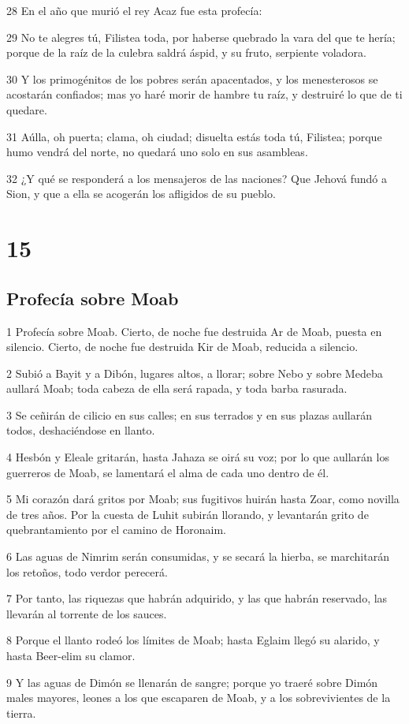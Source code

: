 \par 28 En el año que murió el rey Acaz fue esta profecía:
\par 29 No te alegres tú, Filistea toda, por haberse quebrado la vara del que te hería; porque de la raíz de la culebra saldrá áspid, y su fruto, serpiente voladora.
\par 30 Y los primogénitos de los pobres serán apacentados, y los menesterosos se acostarán confiados; mas yo haré morir de hambre tu raíz, y destruiré lo que de ti quedare.
\par 31 Aúlla, oh puerta; clama, oh ciudad; disuelta estás toda tú, Filistea; porque humo vendrá del norte, no quedará uno solo en sus asambleas.
\par 32 ¿Y qué se responderá a los mensajeros de las naciones? Que Jehová fundó a Sion, y que a ella se acogerán los afligidos de su pueblo.

\chapter{15}

\section*{Profecía sobre Moab}

\par 1 Profecía sobre Moab. Cierto, de noche fue destruida Ar de Moab, puesta en silencio. Cierto, de noche fue destruida Kir de Moab, reducida a silencio.
\par 2 Subió a Bayit y a Dibón, lugares altos, a llorar; sobre Nebo y sobre Medeba aullará Moab; toda cabeza de ella será rapada, y toda barba rasurada.
\par 3 Se ceñirán de cilicio en sus calles; en sus terrados y en sus plazas aullarán todos, deshaciéndose en llanto.
\par 4 Hesbón y Eleale gritarán, hasta Jahaza se oirá su voz; por lo que aullarán los guerreros de Moab, se lamentará el alma de cada uno dentro de él.
\par 5 Mi corazón dará gritos por Moab; sus fugitivos huirán hasta Zoar, como novilla de tres años. Por la cuesta de Luhit subirán llorando, y levantarán grito de quebrantamiento por el camino de Horonaim.
\par 6 Las aguas de Nimrim serán consumidas, y se secará la hierba, se marchitarán los retoños, todo verdor perecerá.
\par 7 Por tanto, las riquezas que habrán adquirido, y las que habrán reservado, las llevarán al torrente de los sauces.
\par 8 Porque el llanto rodeó los límites de Moab; hasta Eglaim llegó su alarido, y hasta Beer-elim su clamor.
\par 9 Y las aguas de Dimón se llenarán de sangre; porque yo traeré sobre Dimón males mayores, leones a los que escaparen de Moab, y a los sobrevivientes de la tierra.

